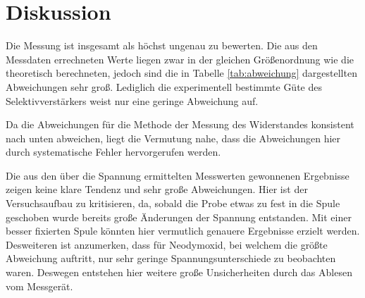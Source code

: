 \section{Diskussion}
\label{sec:Diskussion}

Die Messung ist insgesamt als höchst ungenau zu bewerten. Die aus den Messdaten errechneten
Werte liegen zwar in der gleichen Größenordnung wie die theoretisch berechneten,
jedoch sind die in Tabelle \ref{tab:abweichung} dargestellten Abweichungen sehr groß.
Lediglich die experimentell bestimmte Güte des Selektivverstärkers weist nur eine
geringe Abweichung auf.

Da die Abweichungen für die Methode der Messung des Widerstandes konsistent nach
unten abweichen, liegt die Vermutung nahe, dass die Abweichungen hier durch
systematische Fehler hervorgerufen werden.

Die aus den über die Spannung ermittelten Messwerten gewonnenen Ergebnisse zeigen
keine klare Tendenz und sehr große Abweichungen. Hier ist der Versuchsaufbau zu
kritisieren, da, sobald die Probe etwas zu fest in die Spule geschoben wurde bereits
große Änderungen der Spannung entstanden. Mit einer besser fixierten Spule könnten
hier vermutlich genauere Ergebnisse erzielt werden. Desweiteren ist anzumerken,
dass für Neodymoxid, bei welchem die größte Abweichung auftritt, nur sehr
geringe Spannungsunterschiede zu beobachten waren. Deswegen entstehen hier weitere
große Unsicherheiten durch das Ablesen vom Messgerät.
